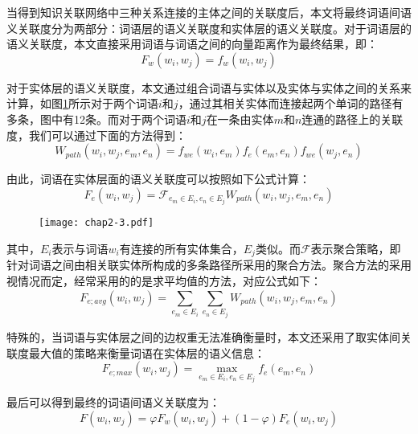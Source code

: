 当得到知识关联网络中三种关系连接的主体之间的关联度后，本文将最终词语间语义关联度分为两部分：词语层的语义关联度和实体层的语义关联度。对于词语层的语义关联度，本文直接采用词语与词语之间的向量距离作为最终结果，即：
\begin{equation}
F_w(w_i, w_j) = f_{w}(w_i, w_j)
\label{F_w}
\end{equation}

\noindent 对于实体层的语义关联度，本文通过组合词语与实体以及实体与实体之间的关系来计算，如图\ref{chap2-3}所示对于两个词语$i$和$j$，通过其相关实体而连接起两个单词的路径有多条，图中有12条。而对于两个词语$i$和$j$在一条由实体$m$和$n$连通的路径上的关联度，我们可以通过下面的方法得到：
\begin{equation}
    W_{path}(w_i, w_j, e_m, e_n) = f_{we}(w_i, e_m)f_e(e_m, e_n)f_{we}(w_j, e_n)
    \label{wpath}
\end{equation}

\noindent 由此，词语在实体层面的语义关联度可以按照如下公式计算：
\begin{equation}
    F_e(w_i, w_j) = \mathscr{F}_{e_m \in E_i,e_n \in E_j}W_{path}(w_i, w_j, e_m, e_n)
    \label{F_e}
\end{equation}

\begin{figure}[!ht]
    \centerline{\texttt{[image: chap2-3.pdf]}}
    \label{chap2-3}
\end{figure}

\noindent 其中，$E_i$表示与词语$w_i$有连接的所有实体集合，$E_j$类似。而$\mathscr{F}$表示聚合策略，即针对词语之间由相关联实体所构成的多条路径所采用的聚合方法。聚合方法的采用视情况而定，经常采用的的是求平均值的方法，对应公式如下：
\begin{equation}
    F_{e;avg}(w_i, w_j) = \sum_{e_m \in E_i}^{ }\sum_{e_n \in E_j}^{ }W_{path}(w_i, w_j, e_m, e_n)
    \label{F_e_avg}
\end{equation}

\noindent 特殊的，当词语与实体层之间的边权重无法准确衡量时，本文还采用了取实体间关联度最大值的策略来衡量词语在实体层的语义信息：
\begin{equation}
    F_{e;max}(w_i, w_j) = \max_{e_m \in E_i,e_n \in E_j}f_e(e_m, e_n)
    \label{F_e_max}
\end{equation}

\noindent 最后可以得到最终的词语间语义关联度为：
\begin{equation}
    F(w_i, w_j) = \varphi F_w(w_i, w_j) + (1 - \varphi) F_e(w_i, w_j)
    \label{F}
\end{equation}

